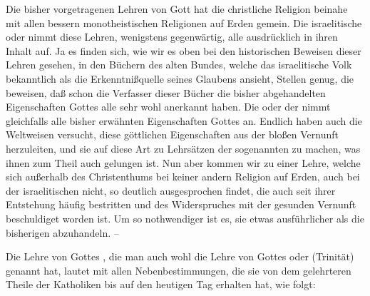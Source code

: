 Die bisher vorgetragenen Lehren von Gott hat die christliche Religion beinahe mit allen bessern monotheistischen Religionen auf Erden gemein. Die israelitische oder  nimmt diese Lehren, wenigstens gegenwärtig, alle ausdrücklich in ihren Inhalt auf. Ja es finden sich, wie wir es oben bei den historischen Beweisen dieser Lehren gesehen, in den Büchern des alten Bundes, welche das israelitische Volk bekanntlich als die Erkenntnißquelle seines Glaubens ansieht, Stellen genug, die beweisen, daß schon die Verfasser dieser Bücher die bisher abgehandelten Eigenschaften Gottes alle sehr wohl anerkannt haben. Die  oder der  nimmt gleichfalls alle bisher erwähnten Eigenschaften Gottes an. Endlich haben auch die Weltweisen versucht, diese göttlichen Eigenschaften aus der bloßen Vernunft herzuleiten, und sie auf diese Art zu Lehrsätzen der sogenannten  zu machen, was ihnen zum Theil auch gelungen ist. Nun aber kommen wir zu einer Lehre, welche sich außerhalb des Christenthums bei keiner andern Religion auf Erden, auch bei der israelitischen nicht, so deutlich ausgesprochen findet, die auch seit ihrer Entstehung häufig bestritten und des Widerspruches mit der gesunden Vernunft beschuldiget worden ist. Um so nothwendiger ist es, sie etwas ausführlicher als die bisherigen abzuhandeln. --\par
Die Lehre von Gottes , die man auch wohl die Lehre von Gottes  oder  (Trinität) genannt hat, lautet mit allen Nebenbestimmungen, die sie von dem gelehrteren Theile der Katholiken bis auf den heutigen Tag erhalten hat, wie folgt:
